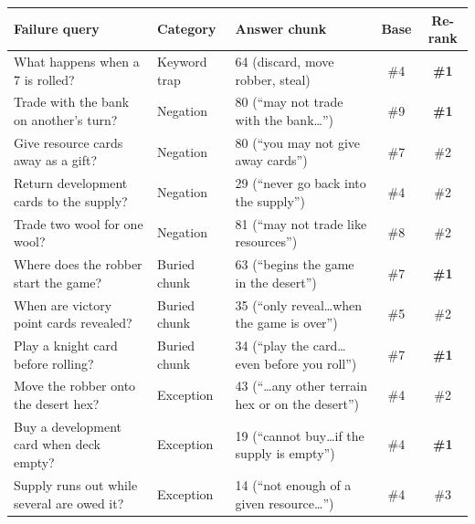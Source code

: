\documentclass[11pt]{article}
\begin{document}
\begin{center}
\small
\begin{tabular}{@{}L{5.6cm} L{2.1cm} L{3.6cm} c c@{}}
\toprule
\textbf{Failure query} & \textbf{Category} & \textbf{Answer chunk} & \textbf{Base} & \textbf{Re-rank} \\
\midrule
What happens when a 7 is rolled? & Keyword trap & 64 (discard, move robber, steal) & \#4 & \textbf{\#1} \\
Trade with the bank on another's turn? & Negation & 80 (``may not trade with the bank\dots'') & \#9 & \textbf{\#1} \\
Give resource cards away as a gift? & Negation & 80 (``you may not give away cards'') & \#7 & \#2 \\
Return development cards to the supply? & Negation & 29 (``never go back into the supply'') & \#4 & \#2 \\
Trade two wool for one wool? & Negation & 81 (``may not trade like resources'') & \#8 & \#2 \\
Where does the robber start the game? & Buried chunk & 63 (``begins the game in the desert'') & \#7 & \textbf{\#1} \\
When are victory point cards revealed? & Buried chunk & 35 (``only reveal\dots when the game is over'') & \#5 & \#2 \\
Play a knight card before rolling? & Buried chunk & 34 (``play the card\dots even before you roll'') & \#7 & \textbf{\#1} \\
Move the robber onto the desert hex? & Exception & 43 (``\dots any other terrain hex or on the desert'') & \#4 & \#2 \\
Buy a development card when deck empty? & Exception & 19 (``cannot buy\dots if the supply is empty'') & \#4 & \textbf{\#1} \\
Supply runs out while several are owed it? & Exception & 14 (``not enough of a given resource\dots'') & \#4 & \#3 \\
\bottomrule
\end{tabular}
\end{center}
\end{document}
